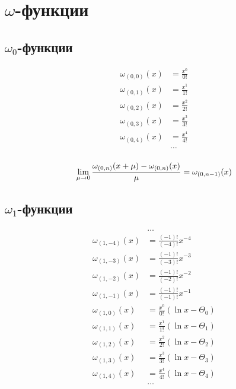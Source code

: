
\section{$\omega$-функции}

\subsection{$\omega_0$-функции}

\begin{equation*}\begin{aligned}
\omega_{(0,0)}(x) &= \frac{x^0}{0!} \\
\omega_{(0,1)}(x) &= \frac{x^1}{1!} \\
\omega_{(0,2)}(x) &= \frac{x^2}{2!} \\
\omega_{(0,3)}(x) &= \frac{x^3}{3!} \\
\omega_{(0,4)}(x) &= \frac{x^4}{4!} \\
&\ldots \\
\end{aligned}\end{equation*}

\begin{equation*}
\lim_{\mu \to 0} \frac{\omega_{(0, n)}(x + \mu) - \omega_{(0, n)}(x)}{\mu} = \omega_{(0, n - 1)}(x) \\
\end{equation*}

\subsection{$\omega_1$-функции}

\begin{equation*} \begin{aligned}
&\ldots \\
\omega_{(1, -4)}(x) &=
  \frac{(-1)!}{(-4)!} x^{-4} \\
\omega_{(1, -3)}(x) &=
  \frac{(-1)!}{(-3)!} x^{-3} \\
\omega_{(1, -2)}(x) &=
  \frac{(-1)!}{(-2)!} x^{-2} \\
\omega_{(1, -1)}(x) &=
  \frac{(-1)!}{(-1)!} x^{-1} \\
\omega_{(1, 0)}(x) &= 
  \frac{x^0}{0!} \left(
  \ln{x} - \Theta_0 \right) \\
\omega_{(1, 1)}(x) &= 
  \frac{x^1}{1!} \left(
  \ln{x} - \Theta_1 \right) \\
\omega_{(1, 2)}(x) &= 
  \frac{x^2}{2!} \left(
  \ln{x} - \Theta_2 \right) \\
\omega_{(1, 3)}(x) &= 
  \frac{x^3}{3!} \left(
  \ln{x} - \Theta_3 \right) \\
\omega_{(1, 4)}(x) &= 
  \frac{x^4}{4!} \left(
  \ln{x} - \Theta_4 \right) \\
&\ldots \\
\end{aligned} \end{equation*}

